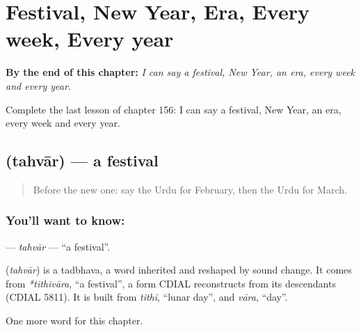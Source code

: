 
\chapter{Festival, New Year, Era, Every week, Every year}
\label{ch:ur-festival-new-year-era-every-week-every-year}

\begin{chapteropening}
\textbf{By the end of this chapter:} \emph{I can say a festival, New Year, an era, every week and every year.}

Complete the last lesson of chapter 156: I can say a festival, New Year, an era, every week and every year.
\end{chapteropening}

\section[\texorpdfstring{\ur{تہوار} (tahvār)}{تہوار (tahvār)}]{ (tahvār) — a festival}

\label{lesson:UR-C156-tahvar}



\begin{quote}
Before the new one: say the Urdu for February, then the Urdu for March.
\end{quote}

\subsection*{You'll want to know: }
\textbf{} — \emph{tahvār} — \textquotedblleft{}a festival\textquotedblright{}.

\begin{cousinweb}
\textbf{} (\emph{tahvār}) is a tadbhava, a word inherited and reshaped by sound change. It comes from \emph{*tithivāra}, \textquotedblleft{}a festival\textquotedblright{}, a form CDIAL reconstructs from its descendants (CDIAL 5811). It is built from \emph{tithi}, \textquotedblleft{}lunar day\textquotedblright{}, and \emph{vāra}, \textquotedblleft{}day\textquotedblright{}.
\end{cousinweb}

\begin{grammarlens}[title={What you've built}]
One more word for this chapter.
\end{grammarlens}

